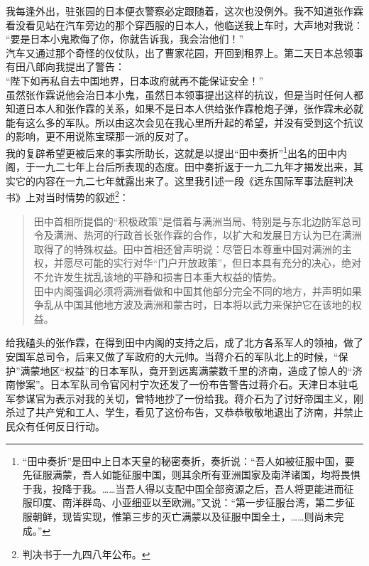 我每逢外出，驻张园的日本便衣警察必定跟随着，这次也没例外。我不知道张作霖看没看见站在汽车旁边的那个穿西服的日本人，他临送我上车时，大声地对我说：\\

“要是日本小鬼欺侮了你，你就告诉我，我会治他们！”\\

汽车又通过那个奇怪的仪仗队，出了曹家花园，开回到租界上。第二天日本总领事有田八郎向我提出了警告：\\

“陛下如再私自去中国地界，日本政府就再不能保证安全！”\\

虽然张作霖说他会治日本小鬼，虽然日本领事提出这样的抗议，但是当时任何人都知道日本人和张作霖的关系，如果不是日本人供给张作霖枪炮子弹，张作霖未必就能有这么多的军队。所以由这次会见在我心里所升起的希望，并没有受到这个抗议的影响，更不用说陈宝琛那一派的反对了。\\

我的复辟希望更被后来的事实所助长，这就是以提出“田中奏折”\footnote{“田中奏折”是田中上日本天皇的秘密奏折，奏折说：“吾人如被征服中国，要先征服满蒙，吾人如能征服中国，则其余所有亚洲国家及南洋诸国，均将畏惧于我，投降于我。……当吾人得以支配中国全部资源之后，吾人将更能进而征服印度、南洋群岛、小亚细亚以至欧洲。”又说：“第一步征服台湾，第二步征服朝鲜，现皆实现，惟第三步的灭亡满蒙以及征服中国全土，……则尚未完成。”
}出名的田中内阁，于一九二七年上台后所表现的态度。田中奏折返于一九二九年才揭发出来，其实它的内容在一九二七年就露出来了。这里我引述一段《远东国际军事法庭判决书》上对当时情势的叙述\footnote{判决书于一九四八年公布。}：\\

\begin{quote}
	田中首相所提倡的“积极政策”是借着与满洲当局、特别是与东北边防军总司令及满洲、热河的行政首长张作霖的合作，以扩大和发展日方认为已在满洲取得了的特殊权益。田中首相还曾声明说：尽管日本尊重中国对满洲的主权，并愿尽可能的实行对华“门户开放政策”，但日本具有充分的决心，绝对不允许发生扰乱该地的平静和损害日本重大权益的情势。\\

田中内阁强调必须将满洲看做和中国其他部分完全不同的地方，并声明如果争乱从中国其他地方波及满洲和蒙古时，日本将以武力来保护它在该地的权益。\\
\end{quote}

给我磕头的张作霖，在得到田中内阁的支持之后，成了北方各系军人的领袖，做了安国军总司令，后来又做了军政府的大元帅。当蒋介石的军队北上的时候，“保护”满蒙地区“权益”的日本军队，竟开到远离满蒙数千里的济南，造成了惊人的“济南惨案”。日本军队司令官冈村宁次还发了一份布告警告过蒋介石。天津日本驻屯军参谋官为表示对我的关切，曾特地抄了一份给我。蒋介石为了讨好帝国主义，刚杀过了共产党和工人、学生，看见了这份布告，又恭恭敬敬地退出了济南，并禁止民众有任何反日行动。\\

